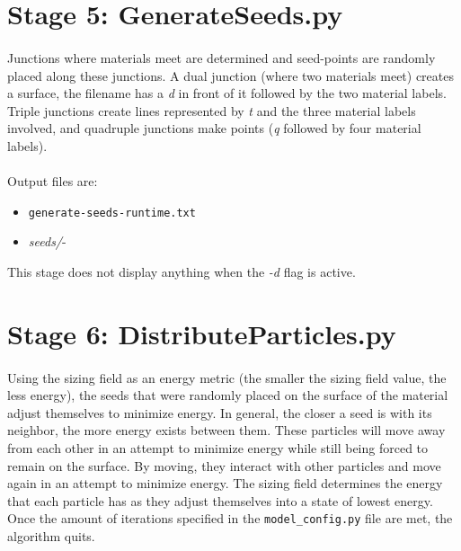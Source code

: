 \documentclass[fleqn,12pt,openany]{book}
\begin{document}
\section{Stage 5: GenerateSeeds.py}

\paragraph{}
Junctions where materials meet are determined and seed-points are randomly 
placed along these junctions. A dual junction (where two materials meet) 
creates a surface, the filename has a \emph{d} in front of it followed by the 
two material labels. Triple junctions create lines represented by \emph{t} and 
the three material labels involved, and quadruple junctions make points 
(\emph{q} followed by four material labels).  \\ \\

Output files are:
\begin{itemize}

\item{\verb+generate-seeds-runtime.txt+} 
\item{\emph{seeds/}}-

\end{itemize}

This stage does not display anything when the \emph{-d} flag is active.

\section{Stage 6: DistributeParticles.py}

\paragraph{}
Using the sizing field as an energy metric (the smaller the sizing field value, 
the less energy), the seeds that were randomly placed on the surface of the 
material adjust themselves to minimize energy. In general, the closer a seed 
is with its neighbor, the more energy exists between them. These particles 
will move away from each other in an attempt to minimize energy while still 
being forced to remain on the surface. By moving, they interact with other 
particles and move again in an attempt to minimize energy. The sizing field 
determines the energy that each particle has as they adjust themselves into a 
state of lowest energy. Once the amount of iterations specified in the 
\verb+model_config.py+ file are met, the algorithm quits.  \\ \\
\end{document}
